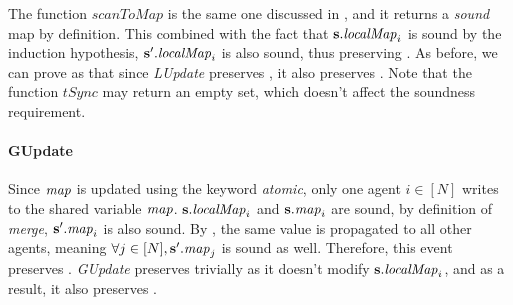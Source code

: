 The function $\mathit{scanToMap}$ is the same one discussed in , and it returns a \emph{sound} map by definition. This combined with the fact that ${\textbf{s}}.\mathit{localMap}_i$ is sound by the induction hypothesis, ${\textbf{s}}'.\mathit{localMap}_i$ is also sound, thus preserving .
As before, we can prove as that since \emph{LUpdate} preserves , it also preserves . Note that the function $\mathit{tSync}$ may return an empty set, which doesn't affect the soundness requirement.

\paragraph{GUpdate}
Since $\mathit{\mathit{map}}$ is updated using the keyword \emph{atomic}, only one agent $i\in [N]$ writes to the shared variable $\mathit{map}$.  ${\textbf{s}}.\mathit{localMap}_i$ and ${\textbf{s}}.\mathit{map}_i$ are sound, by definition of \emph{merge}, ${\textbf{s}}'.\mathit{map}_i$ is also sound. By , the same value is propagated to all other agents, meaning $\forall j \in [N], {\textbf{s}}'.\mathit{map}_j$ is sound as well. Therefore, this event preserves . \emph{GUpdate} preserves  trivially as it doesn't modify ${\textbf{s}}.\mathit{localMap}_i$, and as a result, it also preserves .




%
%



